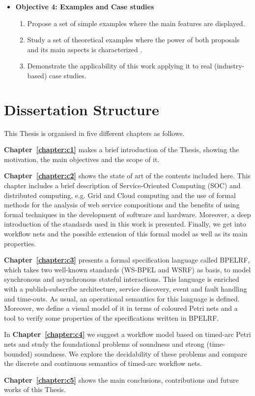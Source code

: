 \begin{itemize}
\item \textbf{Objective 4: Examples and Case studies}

\begin{enumerate}

\item Propose a set of simple examples where the main features are displayed.
\item Study a set of theoretical examples where the power of both proposals and its main aspects is characterized .
\item Demonstrate the applicability of this work applying it to real (industry-based) case studies.
\end{enumerate}

\end{itemize}

\section{Dissertation Structure}\label{structure}

This Thesis is organised in five different chapters as follows.

\textbf{Chapter~\ref{chapter:c1}} makes a brief introduction of the Thesis, showing the motivation, the main objectives and the scope of it.

\textbf{Chapter~\ref{chapter:c2}} shows the state of art of the contents included here. This chapter includes a brief description of Service-Oriented Computing (SOC) and distributed computing, e.g. Grid and Cloud computing and the use of formal methods for the analysis of web service compositions and the benefits of using formal techniques in the development of software and hardware. Moreover, a deep introduction of the standards used in this work is presented. Finally, we get into workflow nets and the possible extension of this formal model as well as its main properties.

\textbf{Chapter~\ref{chapter:c3}} presents a formal specification language called BPELRF, which takes two well-known standards (WS-BPEL and WSRF) as basis, to model synchronous and asynchronous stateful interactions. This language is enriched with a publish-subscribe architecture, service discovery, event and fault handling and time-outs. As usual, an operational semantics for this language is defined. Moreover, we define a visual model of it in terms of coloured Petri nets and a tool to verify some properties of the specifications written in BPELRF.

In \textbf{Chapter~\ref{chapter:c4}} we suggest a workflow model based on timed-arc Petri nets and study
the foundational problems of soundness and strong (time-bounded) soundness.
We explore the decidability of these problems
and compare the discrete and continuous semantics of timed-arc
workflow nets. 

\textbf{Chapter~\ref{chapter:c5}} shows the main conclusions, contributions and future works of this Thesis.